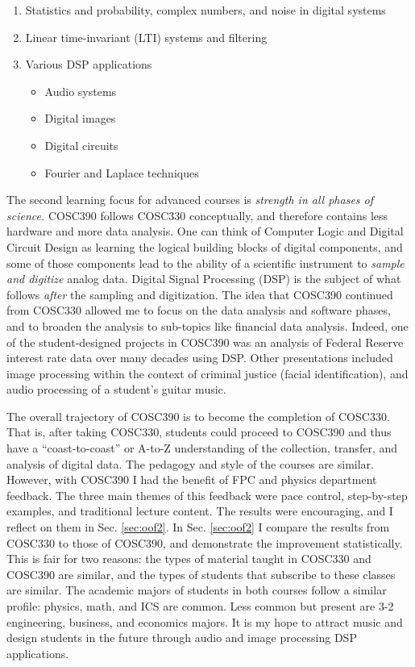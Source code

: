 \documentclass[../../../main.tex]{subfiles}
\begin{document}
\begin{enumerate}
\item Statistics and probability, complex numbers, and noise in digital systems
\item Linear time-invariant (LTI) systems and filtering
\item Various DSP applications
\begin{itemize}
\item Audio systems
\item Digital images
\item Digital circuits
\item Fourier and Laplace techniques
\end{itemize}
\end{enumerate}

The second learning focus for advanced courses is \textit{strength in all phases of science.}  COSC390 follows COSC330 conceptually, and therefore contains less hardware and more data analysis.  One can think of Computer Logic and Digital Circuit Design as learning the logical building blocks of digital components, and some of those components lead to the ability of a scientific instrument to \textit{sample and digitize} analog data.  Digital Signal Processing (DSP) is the subject of what follows \textit{after} the sampling and digitization.  The idea that COSC390 continued from COSC330 allowed me to focus on the data analysis and software phases, and to broaden the analysis to sub-topics like financial data analysis.  Indeed, one of the student-designed projects in COSC390 was an analysis of Federal Reserve interest rate data over many decades using DSP.  Other presentations included image processing within the context of criminal justice (facial identification), and audio processing of a student's guitar music.  \\ \hspace{0.1cm}

The overall trajectory of COSC390 is to become the completion of COSC330.  That is, after taking COSC330, students could proceed to COSC390 and thus have a ``coast-to-coast'' or A-to-Z understanding of the collection, transfer, and analysis of digital data.  The pedagogy and style of the courses are similar.  However, with COSC390 I had the benefit of FPC and physics department feedback.  The three main themes of this feedback were pace control, step-by-step examples, and traditional lecture content.  The results were encouraging, and I reflect on them in Sec. \ref{sec:oof2}.  In Sec. \ref{sec:oof2} I compare the results from COSC330 to those of COSC390, and demonstrate the improvement statistically.  This is fair for two reasons: the types of material taught in COSC330 and COSC390 are similar, and the types of students that subscribe to these classes are similar.  The academic majors of students in both courses follow a similar profile: physics, math, and ICS are common. Less common but present are 3-2 engineering, business, and economics majors.  It is my hope to attract music and design students in the future through audio and image processing DSP applications.  \\ \hspace{0.1cm}
\end{document}
